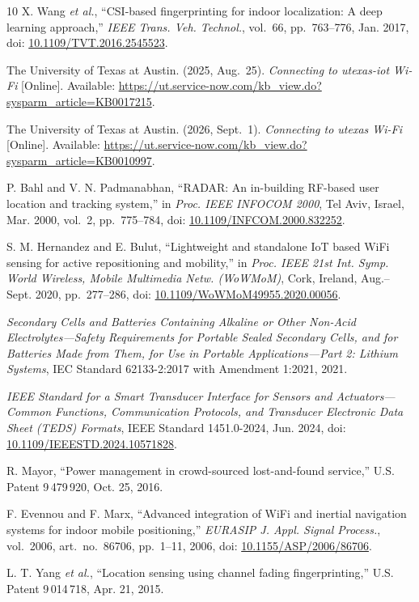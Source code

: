 \documentclass[12pt,letterpaper]{article}
\begin{document}
\begin{thebibliography}{10}
X. Wang \emph{et al.}, ``CSI-based fingerprinting for indoor localization: A deep learning
approach,'' \emph{IEEE Trans. Veh. Technol.}, vol.~66, pp.~763--776, Jan. 2017,
doi: \url{10.1109/TVT.2016.2545523}.

The University of Texas at Austin. (2025, Aug.~25). \emph{Connecting to utexas-iot Wi-Fi}
[Online]. Available: \url{https://ut.service-now.com/kb_view.do?sysparm_article=KB0017215}.

The University of Texas at Austin. (2026, Sept.~1). \emph{Connecting to utexas Wi-Fi} [Online].
Available: \url{https://ut.service-now.com/kb_view.do?sysparm_article=KB0010997}.

P. Bahl and V. N. Padmanabhan, ``RADAR: An in-building RF-based user location and tracking
system,'' in \emph{Proc. IEEE INFOCOM 2000}, Tel Aviv, Israel, Mar. 2000, vol.~2, pp.~775--784,
doi: \url{10.1109/INFCOM.2000.832252}.

S. M. Hernandez and E. Bulut, ``Lightweight and standalone IoT based WiFi sensing for active
repositioning and mobility,'' in \emph{Proc. IEEE 21st Int. Symp. World Wireless, Mobile Multimedia
Netw. (WoWMoM)}, Cork, Ireland, Aug.--Sept. 2020, pp.~277--286,
doi: \url{10.1109/WoWMoM49955.2020.00056}.

\emph{Secondary Cells and Batteries Containing Alkaline or Other Non-Acid Electrolytes---Safety
Requirements for Portable Sealed Secondary Cells, and for Batteries Made from Them, for Use in
Portable Applications---Part 2: Lithium Systems}, IEC Standard 62133-2:2017 with Amendment 1:2021, 2021.

\emph{IEEE Standard for a Smart Transducer Interface for Sensors and Actuators---Common Functions,
Communication Protocols, and Transducer Electronic Data Sheet (TEDS) Formats}, IEEE Standard
1451.0-2024, Jun. 2024, doi: \url{10.1109/IEEESTD.2024.10571828}.

R. Mayor, ``Power management in crowd-sourced lost-and-found service,'' U.S. Patent
9\,479\,920, Oct. 25, 2016.

F. Evennou and F. Marx, ``Advanced integration of WiFi and inertial navigation systems for indoor
mobile positioning,'' \emph{EURASIP J. Appl. Signal Process.}, vol.~2006, art.~no.~86706,
pp.~1--11, 2006, doi: \url{10.1155/ASP/2006/86706}.

L. T. Yang \emph{et al.}, ``Location sensing using channel fading fingerprinting,'' U.S.
Patent 9\,014\,718, Apr. 21, 2015.


\end{thebibliography}
\end{document}
